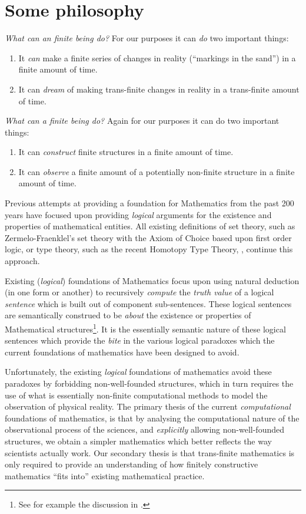 \section{Some philosophy}

\emph{What can an finite being do?} For our purposes it can \emph{do} two
important things:
\begin{enumerate}
\item It \emph{can} make a finite series of changes in reality (``markings in
the sand'') in a finite amount of time.
\item It can \emph{dream} of making trans-finite changes in reality in a
trans-finite amount of time.
\end{enumerate}

\emph{What can a finite being do?} Again for our purposes it can do two
important things:
\begin{enumerate}
\item It can \emph{construct} finite structures in a finite amount of time.
\item It can \emph{observe} a finite amount of a potentially non-finite
structure in a finite amount of time.
\end{enumerate}

Previous attempts at providing a foundation for Mathematics from the past 200
years have focused upon providing \emph{logical} arguments for the existence and
properties of mathematical entities. All existing definitions of set theory, such
as Zermelo-Fraenklel's set theory with the Axiom of Choice based upon first
order logic, or type theory, such as the recent Homotopy Type Theory,
\cite{awodeyCoquandVoevodsky2013homotopyTypeTheory}, continue this approach.

Existing (\emph{logical}) foundations of Mathematics focus upon using natural
deduction (in one form or another) to recursively \emph{compute} the \emph{truth
value} of a logical \emph{sentence} which is built out of component
sub-sentences. These logical sentences are semantically construed to be
\emph{about} the existence or properties of Mathematical structures\footnote{See
for example the discussion in \cite{hatcher1982logicalFoundationsMath}.}. It is
the essentially semantic nature of these logical sentences which provide the
\emph{bite} in the various logical paradoxes which the current foundations of
mathematics have been designed to avoid.

Unfortunately, the existing \emph{logical} foundations of mathematics avoid
these paradoxes by forbidding non-well-founded structures, which in turn
requires the use of what is essentially non-finite computational methods to
model the observation of physical reality. The primary thesis of the current
\emph{computational} foundations of mathematics, is that by analysing the
computational nature of the observational process of the sciences, and
\emph{explicitly} allowing non-well-founded structures, we obtain a simpler
mathematics which better reflects the way scientists actually work. Our
secondary thesis is that trans-finite mathematics is only required to provide an
understanding of how finitely constructive mathematics ``fits into'' existing
mathematical practice.

